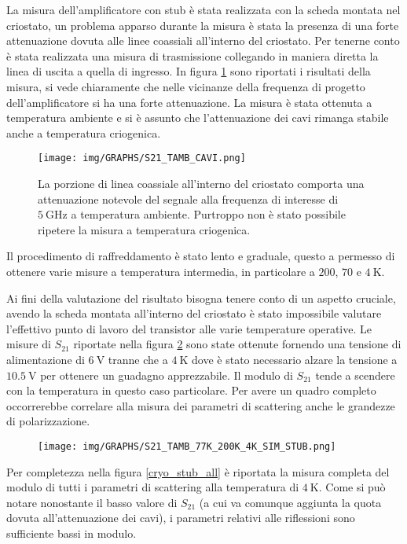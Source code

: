 \documentclass[12pt,oneside]{book}
\begin{document}
La misura dell'amplificatore con stub è stata realizzata con la scheda montata nel criostato, un problema apparso durante la misura è stata la presenza di una forte attenuazione dovuta alle linee coassiali all'interno del criostato. Per tenerne conto è stata realizzata una misura di trasmissione collegando in maniera diretta la linea di uscita a quella di ingresso. In figura \ref{cables} sono riportati i risultati della misura, si vede chiaramente che nelle vicinanze della frequenza di progetto dell'amplificatore si ha una forte attenuazione. La misura è stata ottenuta a temperatura ambiente e si è assunto che l'attenuazione dei cavi rimanga stabile anche a temperatura criogenica. 

\begin{figure}[!htbp]
    \centering
        \texttt{[image: img/GRAPHS/S21\_TAMB\_CAVI.png]}
    \caption{La porzione di linea coassiale all'interno del criostato comporta una attenuazione notevole del segnale alla frequenza di interesse di $\SI{5}{\giga\hertz}$ a temperatura ambiente. Purtroppo non è stato possibile ripetere la misura a temperatura criogenica.}
    \label{cables}
\end{figure}

Il procedimento di raffreddamento è stato lento e graduale, questo a permesso di ottenere varie misure a temperatura intermedia, in particolare a $200$, $70$ e $\SI{4}{\kelvin}$.

Ai fini della valutazione del risultato bisogna tenere conto di un aspetto cruciale, avendo la scheda montata all'interno del criostato è stato impossibile valutare l'effettivo punto di lavoro del transistor alle varie temperature operative. Le misure di $S_{21}$ riportate nella figura \ref{cryo_stub_comparison} sono state ottenute fornendo una tensione di alimentazione di $\SI{6}{\volt}$ tranne che a $\SI{4}{\kelvin}$ dove è stato necessario alzare la tensione a $\SI{10.5}{\volt}$ per ottenere un guadagno apprezzabile.
Il modulo di $S_{21}$ tende a scendere con la temperatura in questo caso particolare. Per avere un quadro completo occorrerebbe correlare alla misura dei parametri di scattering anche le grandezze di polarizzazione.

\begin{figure}[!htbp]
    \centering
        \texttt{[image: img/GRAPHS/S21\_TAMB\_77K\_200K\_4K\_SIM\_STUB.png]}
    \caption{}
    \label{cryo_stub_comparison}
\end{figure}

Per completezza nella figura \ref{cryo_stub_all} è riportata la misura completa del modulo di tutti i parametri di scattering alla temperatura di $\SI{4}{\kelvin}$. Come si può notare nonostante il basso valore di $S_{21}$ (a cui va comunque aggiunta la quota dovuta all'attenuazione dei cavi), i parametri relativi alle riflessioni sono sufficiente bassi in modulo.
\end{document}
